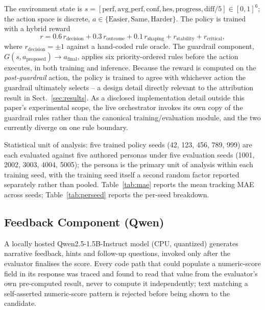\documentclass[runningheads]{llncs}
\begin{document}
The environment state is $s = [\mathrm{perf}, \mathrm{avg\_perf}, \mathrm{conf}, \mathrm{hes}, \mathrm{progress}, \mathrm{diff}/5] \in [0,1]^6$; the action space is discrete, $a \in \{\text{Easier}, \text{Same}, \text{Harder}\}$. The policy is trained with a hybrid reward
\begin{equation}
r = 0.6 \, r_{\mathrm{decision}} + 0.3 \, r_{\mathrm{outcome}} + 0.1 \, r_{\mathrm{shaping}} + r_{\mathrm{stability}} + r_{\mathrm{critical}},
\end{equation}
where $r_{\mathrm{decision}} = \pm 1$ against a hand-coded rule oracle. The guardrail component, $G(s, a_{\mathrm{proposed}}) \rightarrow a_{\mathrm{final}}$, applies six priority-ordered rules before the action executes, in both training and inference. Because the reward is computed on the \emph{post-guardrail} action, the policy is trained to agree with whichever action the guardrail ultimately selects -- a design detail directly relevant to the attribution result in Sect.~\ref{sec:results}. As a disclosed implementation detail outside this paper's experimental scope, the live orchestrator invokes its own copy of the guardrail rules rather than the canonical training/evaluation module, and the two currently diverge on one rule boundary.

Statistical unit of analysis: five trained policy seeds (42, 123, 456, 789, 999) are each evaluated against five authored personas under five evaluation seeds (1001, 2002, 3003, 4004, 5005); the persona is the primary unit of analysis within each training seed, with the training seed itself a second random factor reported separately rather than pooled. Table~\ref{tab:mae} reports the mean tracking MAE across seeds; Table~\ref{tab:perseed} reports the per-seed breakdown.

\subsection{Feedback Component (Qwen)}
\label{sec:feedback-verification}

A locally hosted Qwen2.5-1.5B-Instruct model (CPU, quantized) generates narrative feedback, hints and follow-up questions, invoked only after the evaluator finalises the score. Every code path that could populate a numeric-score field in its response was traced and found to read that value from the evaluator's own pre-computed result, never to compute it independently; text matching a self-asserted numeric-score pattern is rejected before being shown to the candidate.
\end{document}
